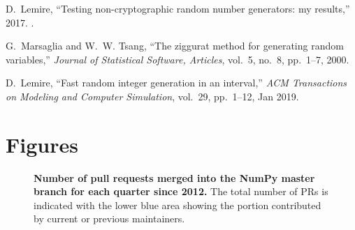 \documentclass{article}
\begin{document}
\begin{thebibliography}{10}
D.~Lemire, ``{Testing non-cryptographic random number generators: my
  results},'' 2017.
.

G.~Marsaglia and W.~W. Tsang, ``The ziggurat method for generating random
  variables,'' {\em Journal of Statistical Software, Articles}, vol.~5, no.~8,
  pp.~1--7, 2000.

D.~Lemire, ``Fast random integer generation in an interval,'' {\em ACM
  Transactions on Modeling and Computer Simulation}, vol.~29, pp.~1--12, Jan
  2019.

\end{thebibliography}

\newpage

\section*{Figures}

\begin{figure}[h]
    \centering

    \caption{\textbf{Number of pull requests merged into the NumPy master branch for each
        quarter since 2012.} The total number of PRs is indicated with the
        lower blue area showing the portion contributed by current or previous
        maintainers.}\label{fig:prs-over-time}
\end{figure}
\end{document}
